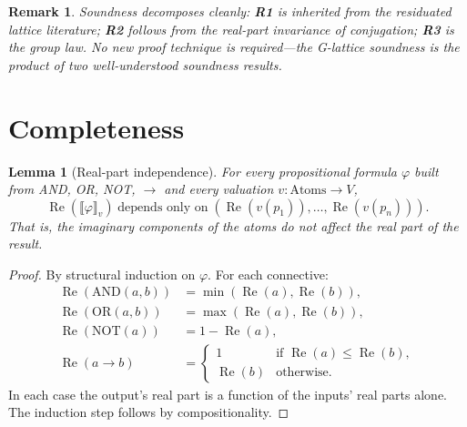 \documentclass[11pt,a4paper]{article}
\newtheorem{lemma}[theorem]{Lemma}
\newtheorem{remark}[theorem]{Remark}
\newcommand{\Real}{\operatorname{Re}}
\begin{document}
\begin{remark}
Soundness decomposes cleanly: \textbf{R1} is inherited from the
residuated lattice literature; \textbf{R2} follows from the
real-part invariance of conjugation; \textbf{R3} is the group law.
No new proof technique is required---the G-lattice soundness is the
\emph{product} of two well-understood soundness results.
\end{remark}

\section{Completeness}
\label{sec:completeness}

\begin{lemma}[Real-part independence]
\label{lem:re-indep}
For every propositional formula $\varphi$ built from AND, OR, NOT,
$\to$ and every valuation $v:\mathrm{Atoms}\to V$,
\[
  \Real(\llbracket\varphi\rrbracket_v)
  \;\text{depends only on}\;
  (\Real(v(p_1)),\ldots,\Real(v(p_n))).
\]
That is, the imaginary components of the atoms do not affect the
real part of the result.
\end{lemma}

\begin{proof}
By structural induction on $\varphi$. For each connective:
\begin{align*}
  \Real(\mathrm{AND}(a,b)) &= \min(\Real(a),\Real(b)), \\
  \Real(\mathrm{OR}(a,b))  &= \max(\Real(a),\Real(b)), \\
  \Real(\mathrm{NOT}(a))   &= 1 - \Real(a), \\
  \Real(a\to b)             &= \begin{cases}1 & \text{if }\Real(a)\leq\Real(b),\\ \Real(b) & \text{otherwise.}\end{cases}
\end{align*}
In each case the output's real part is a function of the inputs'
real parts alone. The induction step follows by compositionality.
\end{proof}
\end{document}
